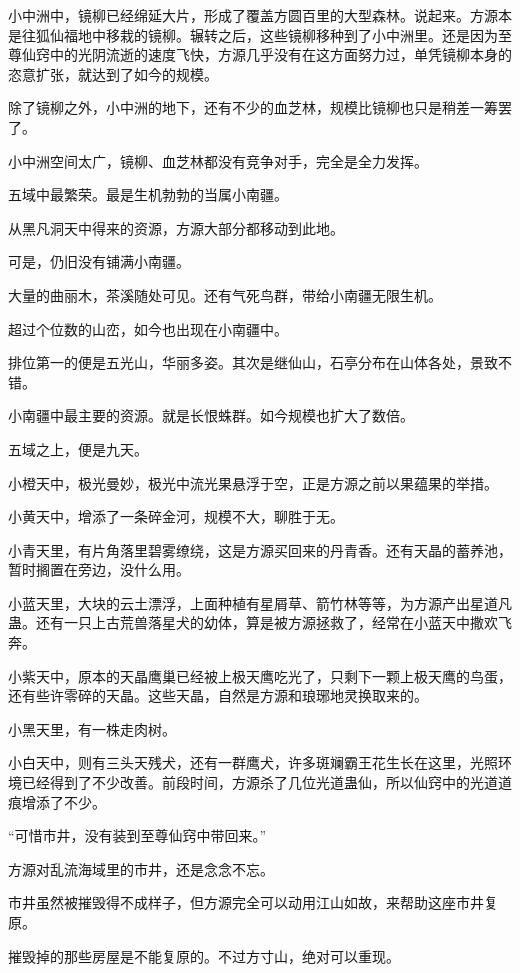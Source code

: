 \begin{this_body}
小中洲中，镜柳已经绵延大片，形成了覆盖方圆百里的大型森林。说起来。方源本是往狐仙福地中移栽的镜柳。辗转之后，这些镜柳移种到了小中洲里。还是因为至尊仙窍中的光阴流逝的速度飞快，方源几乎没有在这方面努力过，单凭镜柳本身的恣意扩张，就达到了如今的规模。

除了镜柳之外，小中洲的地下，还有不少的血芝林，规模比镜柳也只是稍差一筹罢了。

小中洲空间太广，镜柳、血芝林都没有竞争对手，完全是全力发挥。

五域中最繁荣。最是生机勃勃的当属小南疆。

从黑凡洞天中得来的资源，方源大部分都移动到此地。

可是，仍旧没有铺满小南疆。

大量的曲丽木，茶溪随处可见。还有气死鸟群，带给小南疆无限生机。

超过个位数的山峦，如今也出现在小南疆中。

排位第一的便是五光山，华丽多姿。其次是继仙山，石亭分布在山体各处，景致不错。

小南疆中最主要的资源。就是长恨蛛群。如今规模也扩大了数倍。

五域之上，便是九天。

小橙天中，极光曼妙，极光中流光果悬浮于空，正是方源之前以果蕴果的举措。

小黄天中，增添了一条碎金河，规模不大，聊胜于无。

小青天里，有片角落里碧雾缭绕，这是方源买回来的丹青香。还有天晶的蓄养池，暂时搁置在旁边，没什么用。

小蓝天里，大块的云土漂浮，上面种植有星屑草、箭竹林等等，为方源产出星道凡蛊。还有一只上古荒兽落星犬的幼体，算是被方源拯救了，经常在小蓝天中撒欢飞奔。

小紫天中，原本的天晶鹰巢已经被上极天鹰吃光了，只剩下一颗上极天鹰的鸟蛋，还有些许零碎的天晶。这些天晶，自然是方源和琅琊地灵换取来的。

小黑天里，有一株走肉树。

小白天中，则有三头天残犬，还有一群鹰犬，许多斑斓霸王花生长在这里，光照环境已经得到了不少改善。前段时间，方源杀了几位光道蛊仙，所以仙窍中的光道道痕增添了不少。

“可惜市井，没有装到至尊仙窍中带回来。”

方源对乱流海域里的市井，还是念念不忘。

市井虽然被摧毁得不成样子，但方源完全可以动用江山如故，来帮助这座市井复原。

摧毁掉的那些房屋是不能复原的。不过方寸山，绝对可以重现。


\end{this_body}
